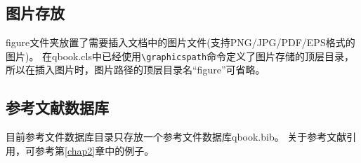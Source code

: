 \subsection{图片存放}

figure文件夹放置了需要插入文档中的图片文件(支持PNG/JPG/PDF/EPS格式的图片)。
在qbook.cls中已经使用\verb|\graphicspath|命令定义了图片存储的顶层目录，所以在插入图片时，图片路径的顶层目录名“figure”可省略。

\subsection{参考文献数据库}

目前参考文件数据库目录只存放一个参考文件数据库qbook.bib。
关于参考文献引用，可参考第\ref{chap2}章中的例子。
